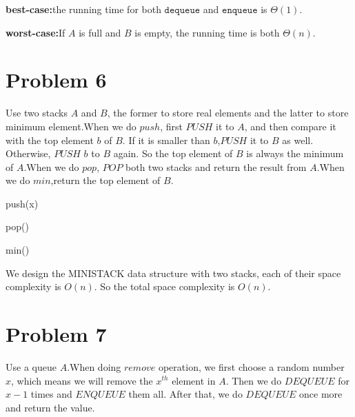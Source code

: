 \documentclass[]{article}
\begin{document}
	\textbf{best-case:}the running time for both $\mathtt{dequeue}$ and $\mathtt{enqueue}$ is $\Theta(1)$.
	
	\textbf{worst-case:}If $A$ is full and $B$ is empty, the running time is both $\Theta(n)$.
	
	\section{Problem 6}
	Use two stacks $A$ and $B$, the former to store real elements and the latter to store minimum element.When we do $push$, first $PUSH$ it to $A$, and then compare it with the top element $b$ of $B$. If it is smaller than $b$,$PUSH$ it to $B$ as well. Otherwise, $PUSH$ $b$ to $B$ again. So the top element of $B$ is always the minimum of $A$.When we do $pop$, $POP$ both two stacks and return the result from $A$.When we do $min$,return the top element of $B$.
	\begin{algorithm}[h]
		\caption{push(x)} %
		\begin{algorithmic}[1]
			\Else
			\EndIf
			\Else
			\EndIf
		\end{algorithmic}
	\end{algorithm}

	\begin{algorithm}[h]
		\caption{pop()} %
		\begin{algorithmic}[1]
		\end{algorithmic}
    \end{algorithm}

	\begin{algorithm}[h]
		\caption{min()} %
		\begin{algorithmic}[1]
		\end{algorithmic}
	\end{algorithm}
	
	We design the MINISTACK data structure with two stacks, each of their space complexity is $O(n)$. So the total space complexity is $O(n)$.
	\section{Problem 7}  
	Use a queue $A$.When doing $remove$ operation, we first choose a random number $x$, which means we will remove the $x^{th}$ element in $A$. Then we do $DEQUEUE$ for $x-1$ times and $ENQUEUE$ them all. After that, we do $DEQUEUE$ once more and return the value.
\end{document}
